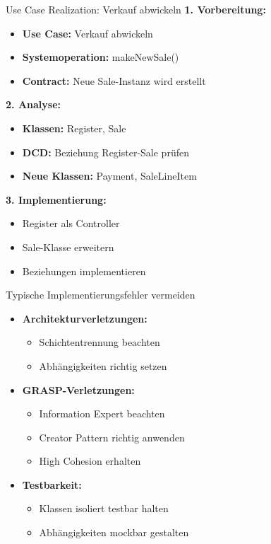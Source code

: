 \begin{example}{Use Case Realization: Verkauf abwickeln}
\textbf{1. Vorbereitung:}
\begin{itemize}
    \item \textbf{Use Case:} Verkauf abwickeln
    \item \textbf{Systemoperation:} makeNewSale()
    \item \textbf{Contract:} Neue Sale-Instanz wird erstellt
\end{itemize}

\textbf{2. Analyse:}
\begin{itemize}
    \item \textbf{Klassen:} Register, Sale
    \item \textbf{DCD:} Beziehung Register-Sale prüfen
    \item \textbf{Neue Klassen:} Payment, SaleLineItem
\end{itemize}

\textbf{3. Implementierung:}
\begin{itemize}
    \item Register als Controller
    \item Sale-Klasse erweitern
    \item Beziehungen implementieren
\end{itemize}
\end{example}

\begin{KR}{Typische Implementierungsfehler vermeiden}\\
\begin{itemize}
    \item \textbf{Architekturverletzungen:}
    \begin{itemize}
        \item Schichtentrennung beachten
        \item Abhängigkeiten richtig setzen
    \end{itemize}
    
    \item \textbf{GRASP-Verletzungen:}
    \begin{itemize}
        \item Information Expert beachten
        \item Creator Pattern richtig anwenden
        \item High Cohesion erhalten
    \end{itemize}
    
    \item \textbf{Testbarkeit:}
    \begin{itemize}
        \item Klassen isoliert testbar halten
        \item Abhängigkeiten mockbar gestalten
    \end{itemize}
\end{itemize}
\end{KR}


